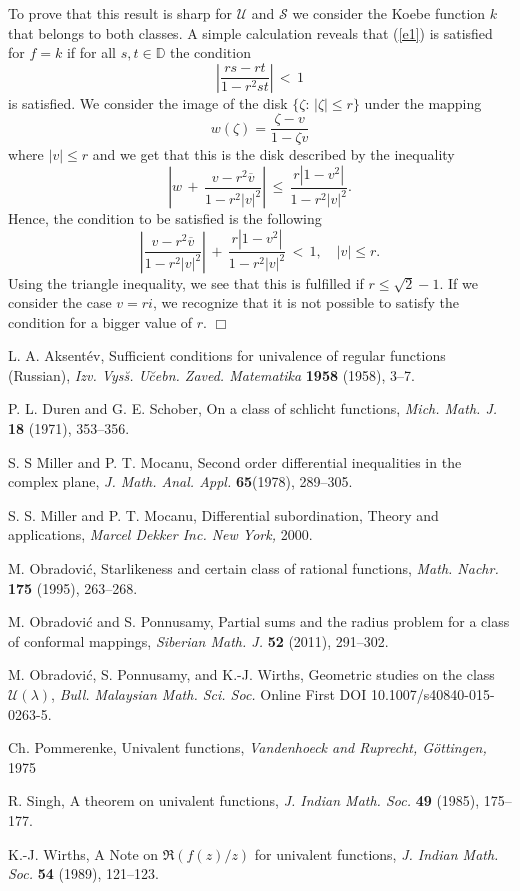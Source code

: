 \documentclass[a4paper,12pt]{amsart}
\theoremstyle{definition}
\begin{document}
To prove that this result is sharp for $\mathcal{U}$ and $\mathcal{S}$ we consider the Koebe function $k$ that belongs to both classes.
A simple calculation reveals that (\ref{e1}) is satisfied for $f=k$ if for all  $s,t \in {{\mathbb D}}$ the condition
\[\left|\frac{rs-rt}{1-r^2st}\right|\,<\,1
\]
is satisfied. We consider the image of the disk $\{\zeta :\, |\zeta|\leq r\}$ under the mapping
\[
w(\zeta)=\frac{\zeta -v}{1-\zeta v}
\]
where $|v|\leq r$ and we get that this is the disk described by the inequality
\[
\left|w\,+\,\frac{v-r^2\overline{v}}{1-r^2|v|^2}\right|\,\leq\, \frac{r|1-v^2|}{1-r^2|v|^2}.\]
Hence, the condition to be satisfied is the following
\[
\left|\frac{v-r^2\overline{v}}{1-r^2|v|^2}\right|\,+\,\frac{r|1-v^2|}{1-r^2|v|^2}\,<\,1,\quad |v|\leq r.
\]
Using the triangle inequality, we see that this is fulfilled if
$r\leq \sqrt{2}-1$. If we consider the case $v=ri$, we recognize that it is not possible to satisfy the condition for a bigger value of $r$.
\hfill $\Box$

\begin{thebibliography}{150}

 L. A. Aksent\'{e}v, Sufficient conditions for univalence of regular functions (Russian),
\textit{Izv. Vys\u{s}. U\u{c}ebn. Zaved. Matematika} \textbf{1958} (1958), 3--7.

 P. L. Duren and G. E. Schober, On a class of schlicht functions, \textit{Mich. Math. J.} \textbf{18} (1971), 353--356.

 S. S Miller and P. T. Mocanu,
Second order differential inequalities in the complex plane,
\textit{J. Math. Anal. Appl.} \textbf{65}(1978), 289--305.

 S. S. Miller and P. T. Mocanu, Differential subordination, Theory and applications,
\textit{Marcel Dekker Inc. New York,} 2000.

 M. Obradovi\'{c}, Starlikeness and certain class of rational functions,
\textit{Math. Nachr.} \textbf{175} (1995), 263--268.

  M. Obradovi\'{c} and S. Ponnusamy, Partial sums and the radius problem for a class of conformal mappings,
\textit{Siberian Math. J.} \textbf{52} (2011), 291--302.

 M. Obradovi\'c, S. Ponnusamy, and K.-J. Wirths,
Geometric studies on the class $\mathcal{U}(\lambda)$,
\textit{Bull. Malaysian Math. Sci. Soc.} Online First DOI 10.1007/s40840-015-0263-5.

 Ch. Pommerenke, Univalent functions, \textit{Vandenhoeck and Ruprecht, G\"ottingen,} 1975

 R. Singh, A theorem on univalent functions,
\textit{J. Indian Math. Soc.} \textbf{49} (1985), 175--177.

 K.-J. Wirths, A Note on $\Re(f(z)/z)$ for univalent functions,
\textit{J. Indian Math. Soc.} \textbf{54} (1989), 121--123.

\end{thebibliography}
\end{document}
